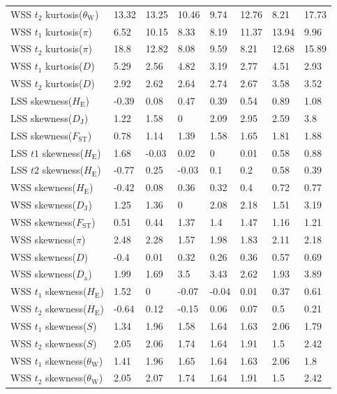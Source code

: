 \documentclass[a4paper, 12pt]{article}
\begin{document}
\begin{tiny}
\begin{longtable}{p{3.0cm}p{1.0cm}p{1.0cm}p{1.0cm}p{1.0cm}p{1.0cm}p{1.0cm}p{1.0cm}}
WSS $t_2$ kurtosis($\theta_{\mathrm{W}}$) & 13.32 & 13.25 & 10.46 & 9.74 & 12.76 & 8.21 & 17.73 \\
WSS $t_1$ kurtosis($\pi$) & 6.52 & 10.15 & 8.33 & 8.19 & 11.37 & 13.94 & 9.96 \\
WSS $t_2$ kurtosis($\pi$) & 18.8 & 12.82 & 8.08 & 9.59 & 8.21 & 12.68 & 15.89 \\
WSS $t_1$ kurtosis($D$) & 5.29 & 2.56 & 4.82 & 3.19 & 2.77 & 4.51 & 2.93 \\
WSS $t_2$ kurtosis($D$) & 2.92 & 2.62 & 2.64 & 2.74 & 2.67 & 3.58 & 3.52 \\
LSS skewness($H_{\mathrm{E}}$) & -0.39 & 0.08 & 0.47 & 0.39 & 0.54 & 0.89 & 1.08 \\
LSS skewness($D_{\mathrm{J}}$) & 1.22 & 1.58 & 0 & 2.09 & 2.95 & 2.59 & 3.8 \\
LSS skewness($F_{\mathrm{ST}}$) & 0.78 & 1.14 & 1.39 & 1.58 & 1.65 & 1.81 & 1.88 \\
LSS $t1$ skewness($H_{\mathrm{E}}$) & 1.68 & -0.03 & 0.02 & 0 & 0.01 & 0.58 & 0.88 \\
LSS $t2$ skewness($H_{\mathrm{E}}$) & -0.77 & 0.25 & -0.03 & 0.1 & 0.2 & 0.58 & 0.39 \\
WSS skewness($H_{\mathrm{E}}$) & -0.42 & 0.08 & 0.36 & 0.32 & 0.4 & 0.72 & 0.77 \\
WSS skewness($D_{\mathrm{J}}$) & 1.25 & 1.36 & 0 & 2.08 & 2.18 & 1.51 & 3.19 \\
WSS skewness($F_{\mathrm{ST}}$) & 0.51 & 0.44 & 1.37 & 1.4 & 1.47 & 1.16 & 1.21 \\
WSS skewness($\pi$) & 2.48 & 2.28 & 1.57 & 1.98 & 1.83 & 2.11 & 2.18 \\
WSS skewness($D$) & -0.4 & 0.01 & 0.32 & 0.26 & 0.36 & 0.57 & 0.69 \\
WSS skewness($D_{\mathrm{a}}$) & 1.99 & 1.69 & 3.5 & 3.43 & 2.62 & 1.93 & 3.89 \\
WSS $t_1$ skewness($H_{\mathrm{E}}$) & 1.52 & 0 & -0.07 & -0.04 & 0.01 & 0.37 & 0.61 \\
WSS $t_2$ skewness($H_{\mathrm{E}}$) & -0.64 & 0.12 & -0.15 & 0.06 & 0.07 & 0.5 & 0.21 \\
WSS $t_1$ skewness($S$) & 1.34 & 1.96 & 1.58 & 1.64 & 1.63 & 2.06 & 1.79 \\
WSS $t_2$ skewness($S$) & 2.05 & 2.06 & 1.74 & 1.64 & 1.91 & 1.5 & 2.42 \\
WSS $t_1$ skewness($\theta_{\mathrm{W}}$) & 1.41 & 1.96 & 1.65 & 1.64 & 1.63 & 2.06 & 1.8 \\
WSS $t_2$ skewness($\theta_{\mathrm{W}}$) & 2.05 & 2.07 & 1.74 & 1.64 & 1.91 & 1.5 & 2.42 \\

\end{longtable}
\end{tiny}
\end{document}
